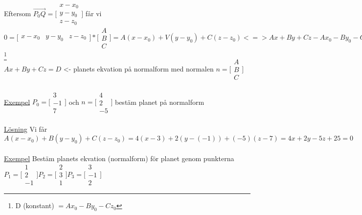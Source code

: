 \documentclass{article}
\begin{document}
Eftersom \(\vec{P_0 Q} = \bigl[\begin{smallmatrix}
x - x_0 \\ y - y_0 \\ z - z_0
\end{smallmatrix} \bigr] \) får vi\\
\(0 = \bigl[\begin{smallmatrix}
x - x_0 & y - y_0 & z - z_0
\end{smallmatrix} \bigr] * \bigl[\begin{smallmatrix}
A \\ B \\ C
\end{smallmatrix} \bigr] = A(x-x_0) + V(y-y_0) + C(z-z_0) <=> Ax + By +Cz - Ax_0 - By_0 - Cz_0 = 0 \)\footnote{D (konstant) \( = Ax_0 - By_0 - Cz_0 \)}\\
\(Ax + By +Cz = D \) <- planets ekvation på normalform med normalen \(n = \bigl[\begin{smallmatrix}
A \\ B \\ C
\end{smallmatrix} \bigr] \)\\
\\
\underline{Exempel} \(P_0 = \bigl[\begin{smallmatrix}
3 \\ -1 \\ 7
\end{smallmatrix} \bigr] \) och \(n = \bigl[\begin{smallmatrix}
4 \\ 2 \\ -5
\end{smallmatrix} \bigr] \) bestäm planet på normalform\\
\\
\underline{Lösning} Vi får \(A(x-x_0) + B(y-y_0) + C(z-z_0) = 4(x-3) + 2(y-(-1)) + (-5)(z-7) = 4x + 2y - 5z + 25 = 0 \) \\
\\
\underline{Exempel} Bestäm planets ekvation (normalform) för planet genom punkterna \(P_1 = \bigl[\begin{smallmatrix}
1 \\ 2 \\ -1
\end{smallmatrix} \bigr] P_2 = \bigl[\begin{smallmatrix}
2 \\ 3 \\ 1
\end{smallmatrix} \bigr] P_3 = \bigl[\begin{smallmatrix}
3 \\ -1 \\ 2
\end{smallmatrix} \bigr]\)\\
\end{document}
